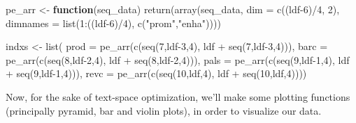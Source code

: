 \documentclass[
  letterpaper,
]{article}
\newenvironment{Shaded}{\begin{snugshade}}{\end{snugshade}}
\newcommand{\AttributeTok}[1]{\textcolor[rgb]{0.40,0.45,0.13}{#1}}
\newcommand{\ControlFlowTok}[1]{\textcolor[rgb]{0.00,0.23,0.31}{\textbf{#1}}}
\newcommand{\DecValTok}[1]{\textcolor[rgb]{0.68,0.00,0.00}{#1}}
\newcommand{\FunctionTok}[1]{\textcolor[rgb]{0.28,0.35,0.67}{#1}}
\newcommand{\NormalTok}[1]{\textcolor[rgb]{0.00,0.23,0.31}{#1}}
\newcommand{\OtherTok}[1]{\textcolor[rgb]{0.00,0.23,0.31}{#1}}
\newcommand{\SpecialCharTok}[1]{\textcolor[rgb]{0.37,0.37,0.37}{#1}}
\newcommand{\StringTok}[1]{\textcolor[rgb]{0.13,0.47,0.30}{#1}}
\begin{document}
\begin{Shaded}
\begin{Highlighting}[]
\NormalTok{pe\_arr }\OtherTok{\textless{}{-}} \ControlFlowTok{function}\NormalTok{(seq\_data)}
  \FunctionTok{return}\NormalTok{(}\FunctionTok{array}\NormalTok{(seq\_data, }\AttributeTok{dim =} \FunctionTok{c}\NormalTok{((ldf}\DecValTok{{-}6}\NormalTok{)}\SpecialCharTok{/}\DecValTok{4}\NormalTok{, }\DecValTok{2}\NormalTok{),}
    \AttributeTok{dimnames =} \FunctionTok{list}\NormalTok{(}\DecValTok{1}\SpecialCharTok{:}\NormalTok{((ldf}\DecValTok{{-}6}\NormalTok{)}\SpecialCharTok{/}\DecValTok{4}\NormalTok{), }\FunctionTok{c}\NormalTok{(}\StringTok{"prom"}\NormalTok{,}\StringTok{"enha"}\NormalTok{))))}

\NormalTok{indxs }\OtherTok{\textless{}{-}} \FunctionTok{list}\NormalTok{(}
  \AttributeTok{prod =} \FunctionTok{pe\_arr}\NormalTok{(}\FunctionTok{c}\NormalTok{(}\FunctionTok{seq}\NormalTok{(}\DecValTok{7}\NormalTok{,ldf}\DecValTok{{-}3}\NormalTok{,}\DecValTok{4}\NormalTok{), ldf }\SpecialCharTok{+} \FunctionTok{seq}\NormalTok{(}\DecValTok{7}\NormalTok{,ldf}\DecValTok{{-}3}\NormalTok{,}\DecValTok{4}\NormalTok{))),}
  \AttributeTok{barc =} \FunctionTok{pe\_arr}\NormalTok{(}\FunctionTok{c}\NormalTok{(}\FunctionTok{seq}\NormalTok{(}\DecValTok{8}\NormalTok{,ldf}\DecValTok{{-}2}\NormalTok{,}\DecValTok{4}\NormalTok{), ldf }\SpecialCharTok{+} \FunctionTok{seq}\NormalTok{(}\DecValTok{8}\NormalTok{,ldf}\DecValTok{{-}2}\NormalTok{,}\DecValTok{4}\NormalTok{))),}
  \AttributeTok{pals =} \FunctionTok{pe\_arr}\NormalTok{(}\FunctionTok{c}\NormalTok{(}\FunctionTok{seq}\NormalTok{(}\DecValTok{9}\NormalTok{,ldf}\DecValTok{{-}1}\NormalTok{,}\DecValTok{4}\NormalTok{), ldf }\SpecialCharTok{+} \FunctionTok{seq}\NormalTok{(}\DecValTok{9}\NormalTok{,ldf}\DecValTok{{-}1}\NormalTok{,}\DecValTok{4}\NormalTok{))),}
  \AttributeTok{revc =} \FunctionTok{pe\_arr}\NormalTok{(}\FunctionTok{c}\NormalTok{(}\FunctionTok{seq}\NormalTok{(}\DecValTok{10}\NormalTok{,ldf,}\DecValTok{4}\NormalTok{), ldf }\SpecialCharTok{+} \FunctionTok{seq}\NormalTok{(}\DecValTok{10}\NormalTok{,ldf,}\DecValTok{4}\NormalTok{))))}
\end{Highlighting}
\end{Shaded}

Now, for the sake of text-space optimization, we'll make some plotting
functions (principally pyramid, bar and violin plots), in order to
visualize our data.
\end{document}
